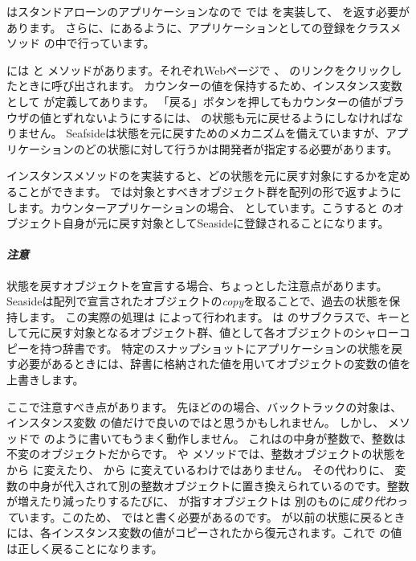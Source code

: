 \documentclass[a4paper,10pt,twoside]{book}
\begin{document}
 はスタンドアローンのアプリケーションなので  では   を実装して、 を返す必要があります。
さらに、にあるように、アプリケーションとしての登録をクラスメソッド の中で行っています。

 には  と メソッドがあります。それぞれWebページで \link{++} 、 \link{--\,--} のリンクをクリックしたときに呼び出されます。
カウンターの値を保持するため、インスタンス変数として が定義してあります。
「戻る」ボタンを押してもカウンターの値がブラウザの値とずれないようにするには、 の状態も元に戻せるようにしなければなりません。
Seafsideは状態を元に戻すためのメカニズムを備えていますが、アプリケーションのどの状態に対して行うかは開発者が指定する必要があります。

インスタンスメソッドのを実装すると、どの状態を元に戻す対象にするかを定めることができます。
 では対象とすべきオブジェクト群を配列の形で返すようにします。カウンターアプリケーションの場合、 としています。こうすると  のオブジェクト自身が元に戻す対象としてSeasideに登録されることになります。

\paragraph{\emph{注意}}
状態を戻すオブジェクトを宣言する場合、ちょっとした注意点があります。
Seasideは配列で宣言されたオブジェクトの\emph{copy}を取ることで、過去の状態を保持します。
この実際の処理は  によって行われます。 は  のサブクラスで、キーとして元に戻す対象となるオブジェクト群、値として各オブジェクトのシャローコピーを持つ辞書です。
特定のスナップショットにアプリケーションの状態を戻す必要があるときには、辞書に格納された値を用いてオブジェクトの変数の値を上書きします。

ここで注意すべき点があります。
先ほどのの場合、バックトラックの対象は、インスタンス変数 の値だけで良いのではと思うかもしれません。
しかし、 メソッドで のように書いてもうまく動作しません。
これはの中身が整数で、整数は不変のオブジェクトだからです。
  や  メソッドでは、整数オブジェクトの状態を から  に変えたり、 から に変えているわけではありません。
その代わりに、  変数の中身が代入されて別の整数オブジェクトに置き換えられているのです。整数が増えたり減ったりするたびに、  が指すオブジェクトは 別のものに\emph{成り代わって}います。このため、 ではと書く必要があるのです。 \mbox{} が以前の状態に戻るときには、各インスタンス変数の値がコピーされた\mbox{}から復元されます。これで  の値は正しく戻ることになります。
\end{document}
